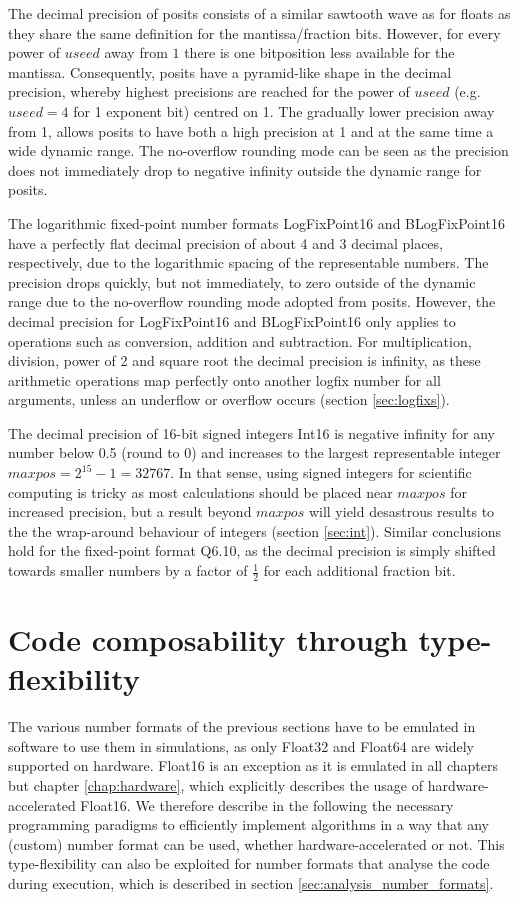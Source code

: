 The decimal precision of posits consists of a similar sawtooth wave as for floats as they share the same definition 
for the mantissa/fraction bits. However, for every power of $useed$ away from $1$ there is one bitposition less
available for the mantissa. Consequently, posits have a pyramid-like shape in the decimal precision, whereby
highest precisions are reached for the power of $useed$ (e.g. $useed = 4$ for 1 exponent bit) centred on 1.
The gradually lower precision away from 1, allows posits to have both a high precision at 1 and at the same time
a wide dynamic range. The no-overflow rounding mode can be seen as the precision does not immediately drop
to negative infinity outside the dynamic range for posits.

The logarithmic fixed-point number formats LogFixPoint16 and BLogFixPoint16 have a perfectly flat decimal precision
of about 4 and 3 decimal places, respectively, due to the logarithmic spacing of the representable numbers.
The precision drops quickly, but not immediately, to zero outside of the dynamic range due to the no-overflow rounding
mode adopted from posits. However, the decimal precision for LogFixPoint16 and BLogFixPoint16 only applies to
operations such as conversion, addition and subtraction. For multiplication, division, power of 2 and square root 
the decimal precision is infinity, as these arithmetic operations map perfectly onto another logfix number for all arguments,
unless an underflow or overflow occurs (section \ref{sec:logfixs}).

The decimal precision of 16-bit signed integers Int16 is negative infinity for any number below 0.5 (round to 0) and
increases to the largest representable integer $maxpos = 2^{15} - 1 =  32767$. In that sense, using signed integers for scientific
computing is tricky as most calculations should be placed near $maxpos$ for increased precision, but a result beyond
$maxpos$ will yield desastrous results to the the wrap-around behaviour of integers (section \ref{sec:int}).
Similar conclusions hold for the fixed-point format Q6.10, as the decimal precision is simply shifted towards smaller
numbers by a factor of $\tfrac{1}{2}$ for each additional fraction bit.

\section{Code composability through type-flexibility}

The various number formats of the previous sections have to be emulated in software to use them in simulations, as only
Float32 and Float64 are widely supported on hardware. Float16 is an exception as it is emulated in all chapters but
chapter \ref{chap:hardware}, which explicitly describes the usage of hardware-accelerated Float16. We therefore
describe in the following the necessary programming paradigms to efficiently implement algorithms in a way
that any (custom) number format can be used, whether hardware-accelerated or not. This type-flexibility can also
be exploited for number formats that analyse the code during execution, which is described in section \ref{sec:analysis_number_formats}.

